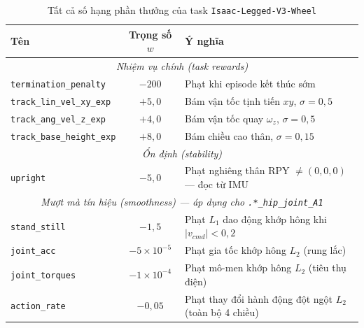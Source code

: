 \begin{table}[H]
    \centering
    \caption{Tất cả số hạng phần thưởng của task \texttt{Isaac-Legged-V3-Wheel}}
    \label{tab:rewards_full}
    \renewcommand{\arraystretch}{1.3}
    \begin{tabular}{|l|c|p{7.5cm}|}
    \hline
    \textbf{Tên} & \textbf{Trọng số $w$} & \textbf{Ý nghĩa} \\
    \hline
    \multicolumn{3}{|c|}{\textit{Nhiệm vụ chính (task rewards)}} \\
    \hline
    \texttt{termination\_penalty}     & $-200$   & Phạt khi episode kết thúc sớm \\
    \texttt{track\_lin\_vel\_xy\_exp} & $+5{,}0$ & Bám vận tốc tịnh tiến $xy$, $\sigma=0{,}5$ \\
    \texttt{track\_ang\_vel\_z\_exp}  & $+4{,}0$ & Bám vận tốc quay $\omega_z$, $\sigma=0{,}5$ \\
    \texttt{track\_base\_height\_exp} & $+8{,}0$ & Bám chiều cao thân, $\sigma=0{,}15$ \\
    \hline
    \multicolumn{3}{|c|}{\textit{Ổn định (stability)}} \\
    \hline
    \texttt{upright} & $-5{,}0$ & Phạt nghiêng thân RPY $\neq (0,0,0)$ — đọc từ IMU \\
    \hline
    \multicolumn{3}{|c|}{\textit{Mượt mà tín hiệu (smoothness) — áp dụng cho \texttt{.*\_hip\_joint\_A1}}} \\
    \hline
    \texttt{stand\_still}  & $-1{,}5$           & Phạt $L_1$ dao động khớp hông khi $|v_{cmd}|<0{,}2$ \\
    \texttt{joint\_acc}    & $-5\times10^{-5}$  & Phạt gia tốc khớp hông $L_2$ (rung lắc) \\
    \texttt{joint\_torques}& $-1\times10^{-4}$  & Phạt mô-men khớp hông $L_2$ (tiêu thụ điện) \\
    \texttt{action\_rate}  & $-0{,}05$          & Phạt thay đổi hành động đột ngột $L_2$ (toàn bộ 4 chiều) \\
    \hline
    \end{tabular}
\end{table}


